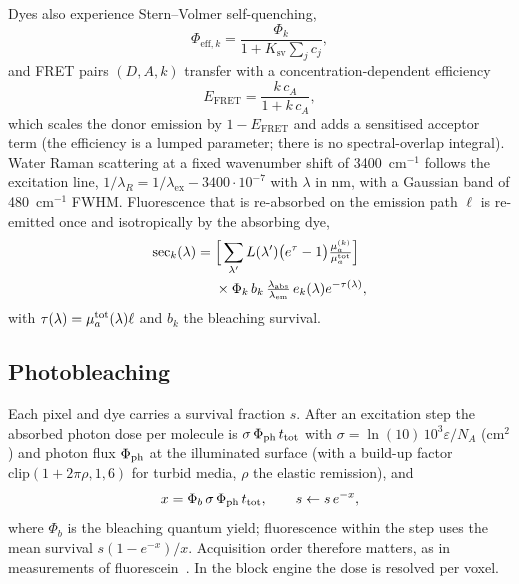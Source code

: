\documentclass[journal]{IEEEtran}
\newcommand{\mua}{\mu_a}
\newcommand{\lex}{\lambda_{\mathrm{ex}}}
\newcommand{\lem}{\lambda_{\mathrm{em}}}
\begin{document}
Dyes also experience Stern--Volmer self-quenching,
\begin{equation}
\Phi_{\mathrm{eff},k}=\frac{\Phi_k}{1+K_{\mathrm{sv}}\sum_j c_j},
\label{eq:quench}
\end{equation}
and FRET pairs $(D,A,k)$ transfer with a concentration-dependent efficiency
\begin{equation}
E_{\mathrm{FRET}}=\frac{k\,c_A}{1+k\,c_A},
\label{eq:fret}
\end{equation}
which scales the donor emission by $1-E_{\mathrm{FRET}}$ and adds a sensitised acceptor term (the efficiency is a lumped parameter; there is no spectral-overlap integral). Water Raman scattering at a fixed wavenumber shift of 3400~cm$^{-1}$ follows the excitation line, $1/\lambda_R=1/\lex-3400\cdot10^{-7}$ with $\lambda$ in nm, with a Gaussian band of 480~cm$^{-1}$ FWHM. Fluorescence that is re-absorbed on the emission path $\ell$ is re-emitted once and isotropically by the absorbing dye,
\begin{equation}
\begin{split}\mathrm{sec}_k(\lambda)={}&\Big[\sum_{\lambda'} L(\lambda')\big(e^{\tau}-1\big)\tfrac{\mua^{(k)}}{\mua^{\rm tot}}\Big]\\&\times\Phi_k\,b_k\,\tfrac{\lambda_{\rm abs}}{\lem}\,e_k(\lambda)e^{-\tau(\lambda)},\end{split}
\label{eq:secondary}
\end{equation}
with $\tau(\lambda)=\mua^{\rm tot}(\lambda)\ell$ and $b_k$ the bleaching survival.

\subsection{Photobleaching}
Each pixel and dye carries a survival fraction $s$. After an excitation step the absorbed photon dose per molecule is $\sigma\,\Phi_{\rm ph}\,t_{\rm tot}$ with $\sigma=\ln(10)\,10^3\varepsilon/N_A$ (cm$^2$) and photon flux $\Phi_{\rm ph}$ at the illuminated surface (with a build-up factor $\mathrm{clip}(1+2\pi\rho,1,6)$ for turbid media, $\rho$ the elastic remission), and
\begin{equation}
x=\Phi_b\,\sigma\,\Phi_{\rm ph}\,t_{\rm tot},\qquad s\leftarrow s\,e^{-x},
\label{eq:bleach}
\end{equation}
where $\Phi_b$ is the bleaching quantum yield; fluorescence within the step uses the mean survival $s(1-e^{-x})/x$. Acquisition order therefore matters, as in measurements of fluorescein~\cite{song1995,eggeling1998}. In the block engine the dose is resolved per voxel.
\end{document}
